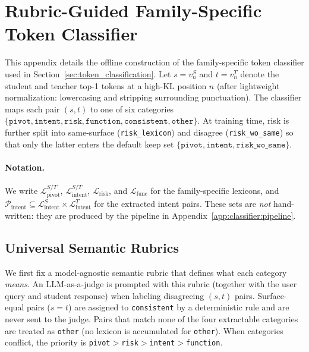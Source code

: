 
\section{Rubric-Guided Family-Specific Token Classifier}
\label{app:classifier}

This appendix details the offline construction of the family-specific token
classifier used in Section~\ref{sec:token_classification}.
Let $s\!=\!v_n^{S}$ and $t\!=\!v_n^{T}$ denote the student and teacher top-1
tokens at a high-KL position $n$ (after lightweight normalization:
lowercasing and stripping surrounding punctuation).
The classifier maps each pair $(s,t)$ to one of six categories
$\{\texttt{pivot},\texttt{intent},\texttt{risk},\texttt{function},
\texttt{consistent},\texttt{other}\}$.
At training time, risk is further split into same-surface
(\texttt{risk\_lexicon}) and disagree (\texttt{risk\_wo\_same}) so that only the
latter enters the default keep set
$\{\texttt{pivot},\texttt{intent},\texttt{risk\_wo\_same}\}$.

\paragraph{Notation.}
We write $\mathcal{L}_{\mathrm{pivot}}^{S/T}$,
$\mathcal{L}_{\mathrm{intent}}^{S/T}$,
$\mathcal{L}_{\mathrm{risk}}$, and
$\mathcal{L}_{\mathrm{func}}$ for the family-specific lexicons, and
$\mathcal{P}_{\mathrm{intent}}\subseteq
\mathcal{L}_{\mathrm{intent}}^{S}\!\times\!\mathcal{L}_{\mathrm{intent}}^{T}$
for the extracted intent pairs.
These sets are \emph{not} hand-written: they are produced by the pipeline in
Appendix~\ref{app:classifier:pipeline}.

\subsection{Universal Semantic Rubrics}
\label{app:classifier:rubrics}

We first fix a model-agnostic semantic rubric that defines what each category
\emph{means}.
An LLM-as-a-judge is prompted with this rubric (together with the user query and
student response) when labeling disagreeing $(s,t)$ pairs.
Surface-equal pairs ($s\!=\!t$) are assigned to \texttt{consistent} by a
deterministic rule and are never sent to the judge.
Pairs that match none of the four extractable categories are treated as
\texttt{other} (no lexicon is accumulated for \texttt{other}).
When categories conflict, the priority is
\texttt{pivot}$>$\texttt{risk}$>$\texttt{intent}$>$\texttt{function}.

